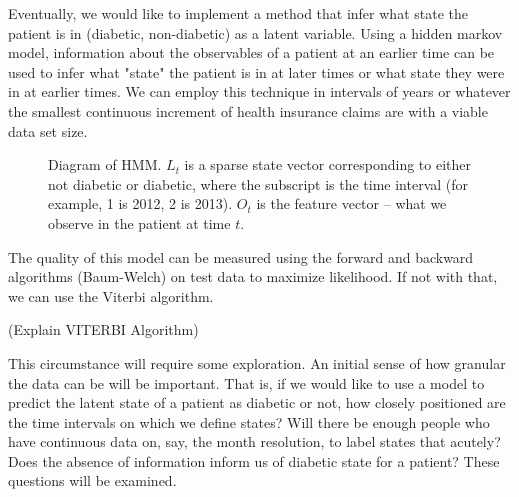\documentclass{article}
\begin{document}
Eventually, we would like to implement a method that infer what state the patient is in (diabetic, non-diabetic) as a latent variable. Using a hidden markov model, information about the observables of a patient at an earlier time can be used to infer what "state" the patient is in at later times or what state they were in at earlier times. We can employ this technique in intervals of years or whatever the smallest continuous increment of health insurance claims are with a viable data set size.
\begin{figure}
\caption{Diagram of HMM. $\mathit{L}_t$ is a sparse state vector corresponding to either not diabetic or diabetic, where the subscript is the time interval (for example, 1 is 2012, 2 is 2013). $\mathit{O}_t$ is the feature vector -- what we observe in the patient at time $t$. }
\end{figure}

The quality of this model can be measured using the forward and backward algorithms (Baum-Welch) on test data to maximize likelihood. If not with that, we can use the Viterbi algorithm.

(Explain VITERBI Algorithm)



This circumstance will require some exploration. An initial sense of how granular the data can be will be important. That is, if we would like to use a model to predict the latent state of a patient as diabetic or not, how closely positioned are the time intervals on which we define states? Will there be enough people who have continuous data on, say, the month resolution, to label states that acutely? Does the absence of information inform us of diabetic state for a patient? These questions will be examined.
\end{document}
